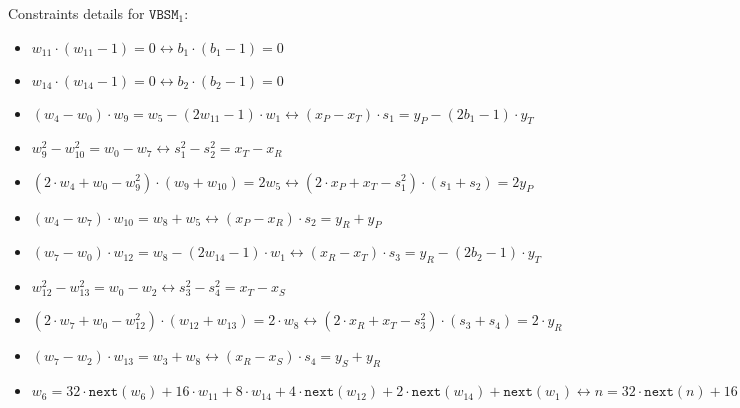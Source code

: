 Constraints details for $\texttt{VBSM}_1$:
\begin{itemize}
    \item $w_{11} \cdot (w_{11} - 1) = 0
				\longleftrightarrow 
    			b_1 \cdot (b_1 - 1) = 0$
    \item $w_{14} \cdot (w_{14} - 1) = 0
    			\longleftrightarrow
    			b_2 \cdot (b_2 - 1) = 0$
    \item $(w_{4} - w_{0}) \cdot w_9 = w_5 - (2w_{11} - 1) \cdot w_1
    			\longleftrightarrow
    			(x_P - x_T) \cdot s_1 = y_P - (2b_1 - 1) \cdot y_T$
    \item $w_9^2 - w_{10}^2 = w_{0} - w_7
    			\longleftrightarrow
    			s_1^2 - s_2^2 = x_T - x_R$
    \item $(2 \cdot w_{4} + w_{0} - w_9^2) \cdot (w_9 + w_{10}) = 2w_5
    			\longleftrightarrow
    			(2 \cdot x_P + x_T - s_1^2) \cdot (s_1 + s_2) = 2y_P$
    \item $(w_{4} - w_7) \cdot w_{10} = w_8 + w_5
    			\longleftrightarrow
    			(x_P - x_R) \cdot s_2 = y_R + y_P$
    \item $(w_7 - w_{0}) \cdot w_{12} = w_8 - (2w_{14} - 1) \cdot w_1
    			\longleftrightarrow
    			(x_R - x_T) \cdot s_3 = y_R - (2b_2 - 1) \cdot y_T$
    \item $w_{12}^2 - w_{13}^2 = w_{0} - w_2
    			\longleftrightarrow
    			s_3^2 - s_4^2 = x_T - x_S$
    \item $(2 \cdot w_7 + w_{0} - w_{12}^2) \cdot (w_{12} + w_{13}) = 2 \cdot w_8
    			\longleftrightarrow
    			(2 \cdot x_R + x_T - s_3^2) \cdot (s_3 + s_4) = 2 \cdot y_R$
    \item $(w_7 - w_2) \cdot w_{13} = w_{3} + w_8
    			\longleftrightarrow
    			(x_R - x_S) \cdot s_4 = y_S + y_R$
    \item $w_6 = 32 \cdot \texttt{next}(w_6) + 16 \cdot w_{11} + 8 \cdot w_{14} + 4 \cdot \texttt{next}(w_{12}) + 2 \cdot \texttt{next}(w_{14}) + \texttt{next}(w_1)
    			\longleftrightarrow
    			n = 32 \cdot \texttt{next}(n) + 16 \cdot b_1 + 8 \cdot b_2 + 4 \cdot \texttt{next}(b_1) + 2 \cdot \texttt{next}(b_2) + \texttt{next}(b_3)$
\end{itemize}

